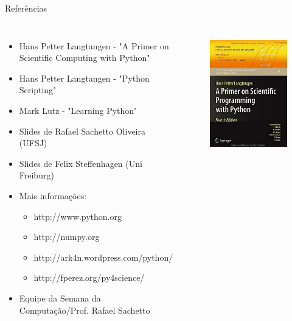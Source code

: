\documentclass[12pt,t,graphics]{beamer}
\begin{document}
\begin{frame}[t]{Referências}
	\vspace{-1cm}
	\begin{columns}
		\begin{itemize}
			\item Hans Petter Langtangen - "A Primer on Scientific Computing
			with Python"
			\item Hans Petter Langtangen - "Python Scripting"
			\item Mark Lutz - "Learning Python"
			\item Slides de Rafael Sachetto Oliveira (UFSJ)
			\item Slides de Felix Steffenhagen (Uni Freiburg)
			\item Mais informações:
			\begin{itemize}
				\item http://www.python.org
				\item http://numpy.org
				\item http://ark4n.wordpress.com/python/
				\item http://fperez.org/py4science/
			\end{itemize}
			\item Equipe da Semana da Computação/Prof. Rafael Sachetto
		\end{itemize}
		\begin{figure}
			\centering
			\includegraphics[scale=0.15]{img/book.png}
			\\

\end{figure}
\end{columns}
\end{frame}
\end{document}
